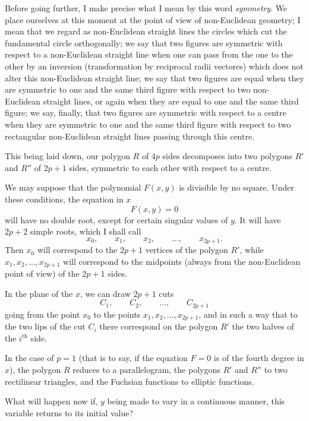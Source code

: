 \documentclass{article}
\begin{document}
Before going further, I make precise what I mean by this word \emph{symmetry}. We place ourselves at this moment at the point of view of non-Euclidean geometry; I mean that we regard as non-Euclidean straight lines the circles which cut the fundamental circle orthogonally; we say that two figures are symmetric with respect to a non-Euclidean straight line when one can pass from the one to the other by an inversion (transformation by reciprocal radii vectores) which does not alter this non-Euclidean straight line; we say that two figures are equal when they are symmetric to one and the same third figure with respect to two non-Euclidean straight lines, or again when they are equal to one and the same third figure; we say, finally, that two figures are symmetric with respect to a centre when they are symmetric to one and the same third figure with respect to two rectangular non-Euclidean straight lines passing through this centre.

This being laid down, our polygon $R$ of $4p$ sides decomposes into two polygons $R'$ and $R''$ of $2p + 1$ sides, symmetric to each other with respect to a centre.

We may suppose that the polynomial $F(x, y)$ is divisible by no square. Under these conditions, the equation in $x$
\[ F(x, y) = 0 \]
will have no double root, except for certain singular values of $y$. It will have $2p + 2$ simple roots, which I shall call
\[ x_{0}, \qquad x_{1}, \qquad x_{2}, \qquad \ldots, \qquad x_{2p+1}. \]
Then $x_{0}$ will correspond to the $2p + 1$ vertices of the polygon $R'$, while $x_{1}, x_{2}, \ldots, x_{2p+1}$ will correspond to the midpoints (always from the non-Euclidean point of view) of the $2p + 1$ sides.

In the plane of the $x$, we can draw $2p + 1$ cuts
\[ C_{1}, \qquad C_{2}, \qquad \ldots, \qquad C_{2p+1} \]
going from the point $x_{0}$ to the points $x_{1}, x_{2}, \ldots, x_{2p+1}$, and in such a way that to the two lips of the cut $C_{i}$ there correspond on the polygon $R'$ the two halves of the $i^{\text{th}}$ side.


In the case of $p = 1$ (that is to say, if the equation $F = 0$ is of the fourth degree in $x$), the polygon $R$ reduces to a parallelogram, the polygons $R'$ and $R''$ to two rectilinear triangles, and the Fuchsian functions to elliptic functions.

What will happen now if, $y$ being made to vary in a continuous manner, this variable returns to its initial value?
\end{document}
